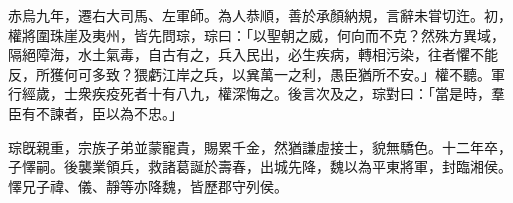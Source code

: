 \begin{pinyinscope}
 
 赤烏九年，遷右大司馬、左軍師。為人恭順，善於承顏納規，言辭未甞切迕。初，權將圍珠崖及夷州，皆先問琮，琮曰：「以聖朝之威，何向而不克？然殊方異域，隔絕障海，水土氣毒，自古有之，兵入民出，必生疾病，轉相污染，往者懼不能反，所獲何可多致？猥虧江岸之兵，以兾萬一之利，愚臣猶所不安。」權不聽。軍行經歲，士衆疾疫死者十有八九，權深悔之。後言次及之，琮對曰：「當是時，羣臣有不諫者，臣以為不忠。」
 
 
琮旣親重，宗族子弟並蒙寵貴，賜累千金，然猶謙虛接士，貌無驕色。十二年卒，子懌嗣。後襲業領兵，救諸葛誕於壽春，出城先降，魏以為平東將軍，封臨湘侯。懌兄子禕、儀、靜等亦降魏，皆歷郡守列侯。
 
 
\end{pinyinscope}